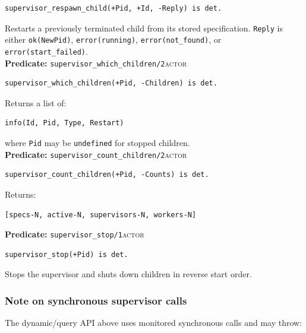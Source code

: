 \begin{verbatim}
supervisor_respawn_child(+Pid, +Id, -Reply) is det.
\end{verbatim}

\noindent Restarts a previously terminated child from its stored specification.
\texttt{Reply} is either \texttt{ok(NewPid)}, \texttt{error(running)},
\texttt{error(not\_found)}, or \texttt{error(start\_failed)}.\\

\bigskip
\noindent \textbf{Predicate:} \texttt{supervisor\_which\_children/2}\hfill\textsc{actor}

\begin{verbatim}
supervisor_which_children(+Pid, -Children) is det.
\end{verbatim}

\noindent Returns a list of:

\begin{verbatim}
info(Id, Pid, Type, Restart)
\end{verbatim}

\noindent where \texttt{Pid} may be \texttt{undefined} for stopped
children.\\

\bigskip
\noindent \textbf{Predicate:} \texttt{supervisor\_count\_children/2}\hfill\textsc{actor}

\begin{verbatim}
supervisor_count_children(+Pid, -Counts) is det.
\end{verbatim}

\noindent Returns:

\begin{verbatim}
[specs-N, active-N, supervisors-N, workers-N]
\end{verbatim}

\bigskip
\noindent \textbf{Predicate:} \texttt{supervisor\_stop/1}\hfill\textsc{actor}

\begin{verbatim}
supervisor_stop(+Pid) is det.
\end{verbatim}

\noindent Stops the supervisor and shuts down children in reverse start
order.\\

\subsubsection{Note on synchronous supervisor calls}

\noindent The dynamic/query API above uses monitored synchronous calls and may
throw:

